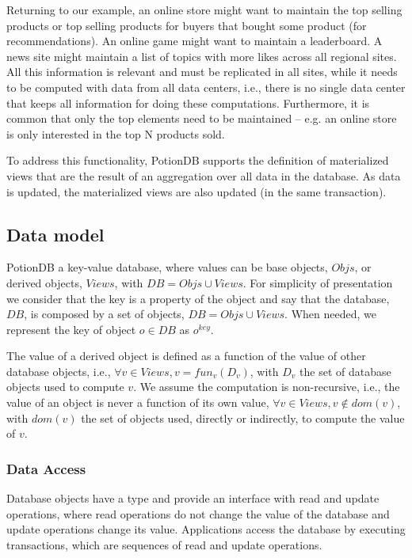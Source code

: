 \documentclass{vldb}
\begin{document}
Returning to our example, an online store might want to maintain the top selling products or top selling products
for buyers that bought some product (for recommendations).
An online game might want to maintain a leaderboard. 
A news site might maintain a list of topics with more likes across all regional sites.
All this information is relevant and must be replicated in all sites, while it needs to be computed with 
data from all data centers, i.e., there is no single data center that keeps all information for doing
these computations. 
Furthermore, it is common that only the top elements need to be maintained -- e.g. an online store
is only interested in the top N products sold.

To address this functionality, PotionDB supports the definition of materialized views that 
are the result of an aggregation over all data in the database. As data is updated, the materialized 
views are also updated (in the same transaction). 

\subsection{Data model}

PotionDB a key-value database,  where values can be base objects, $Objs$,  or derived objects,
$Views$, with $DB = Objs \cup Views$. For simplicity of presentation we consider that the key is a property of
the object and say that the database, $DB$, is composed by a set of objects, $DB = Objs \cup Views$. 
When needed, we represent the key of object $o \in DB$ as $o^{key}$.

The value of a derived object is defined as a function of the value of other database objects, i.e.,
$\forall v \in Views, v=fun_v(D_v)$, with  $D_v$ the set of database objects used to compute $v$.
We assume the computation is non-recursive, i.e., the value of an object is never a function of its own value, 
$\forall v \in Views, v \not \in dom(v)$, with $dom(v)$ the set of objects used, directly or indirectly, to 
compute the value of $v$.

\subsubsection{Data Access}

Database objects have a type and provide an interface with read and update operations, 
where read operations do not change the value of the database and update operations change
its value. Applications access the database by executing transactions, which are sequences of
read and update operations. 
\end{document}
